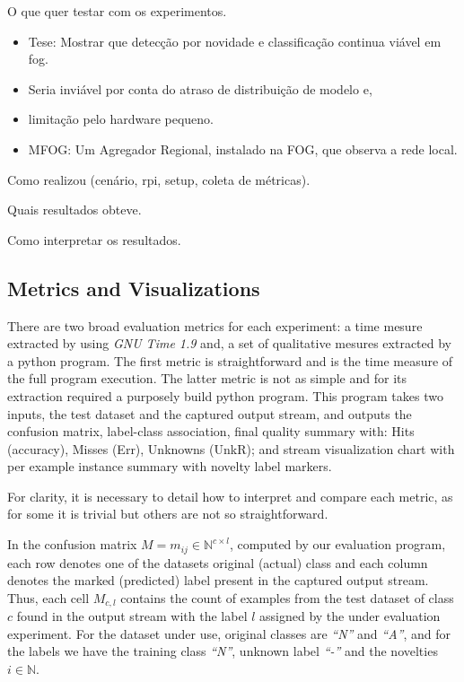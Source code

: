 \documentclass[conference]{IEEEtran}
\begin{document}
\begin{highlight}
O que quer testar com os experimentos.
\begin{itemize}
  \item Tese: Mostrar que detecção por novidade e classificação continua viável em fog.
  \item Seria inviável por conta do atraso de distribuição de modelo e,
  \item limitação pelo hardware pequeno.
  \item MFOG: Um Agregador Regional, instalado na FOG, que observa a rede local.
\end{itemize}

Como realizou (cenário, rpi, setup, coleta de métricas).

Quais resultados obteve.

Como interpretar os resultados.
\end{highlight}


\subsection{Metrics and Visualizations}

There are two broad evaluation metrics for each experiment:
a time mesure extracted by using \emph{GNU Time 1.9} and,
a set of qualitative mesures extracted by a python program.
The first metric is straightforward and is the time measure of the full program execution.
The latter metric is not as simple and for its extraction required a
purposely build python program.
This program takes two inputs, the test dataset and the captured output stream,
and outputs the confusion matrix, label-class association,
final quality summary with: Hits (accuracy), Misses (Err), Unknowns (UnkR); and
stream visualization chart with per example instance summary with novelty label markers.

For clarity, it is necessary to detail how to interpret and compare each metric,
as for some it is trivial but others are not so straightforward.

In the confusion matrix $M = m_{ij} \in \mathbb{N} ^{c \times{} l}$,
computed by our evaluation program,
each row denotes one of the datasets original (actual) class
and each column denotes the marked (predicted) label present in the captured output stream.
Thus, each cell $M_{c, l}$ contains the count of examples from the test dataset of class $c$
found in the output stream with the label $l$ assigned by the under evaluation experiment.
For the dataset under use, original classes are \emph{``N''} and \emph{``A''}, and
for the labels we have the training class \emph{``N''}, unknown label \emph{``-''} and
the novelties $i \in \mathbb{N}$.
\end{document}

